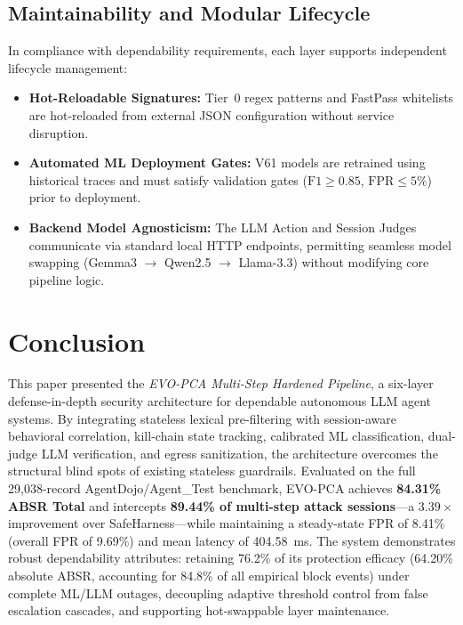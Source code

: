 \documentclass[conference]{IEEEtran}
\begin{document}
\subsection{Maintainability and Modular Lifecycle}
In compliance with dependability requirements, each layer supports independent lifecycle management:
\begin{itemize}[leftmargin=*]
    \item \textbf{Hot-Reloadable Signatures:} Tier~0 regex patterns and FastPass whitelists are hot-reloaded from external JSON configuration without service disruption.
    \item \textbf{Automated ML Deployment Gates:} V61 models are retrained using historical traces and must satisfy validation gates ($\text{F1} \geq 0.85$, $\text{FPR} \leq 5\%$) prior to deployment.
    \item \textbf{Backend Model Agnosticism:} The LLM Action and Session Judges communicate via standard local HTTP endpoints, permitting seamless model swapping (Gemma3 $\to$ Qwen2.5 $\to$ Llama-3.3) without modifying core pipeline logic.
\end{itemize}

\section{Conclusion}
This paper presented the \textit{EVO-PCA Multi-Step Hardened Pipeline}, a six-layer defense-in-depth security architecture for dependable autonomous LLM agent systems. By integrating stateless lexical pre-filtering with session-aware behavioral correlation, kill-chain state tracking, calibrated ML classification, dual-judge LLM verification, and egress sanitization, the architecture overcomes the structural blind spots of existing stateless guardrails. Evaluated on the full 29,038-record AgentDojo/Agent\_Test benchmark, EVO-PCA achieves \textbf{84.31\% ABSR Total} and intercepts \textbf{89.44\% of multi-step attack sessions}---a $3.39\times$ improvement over SafeHarness---while maintaining a steady-state FPR of 8.41\% (overall FPR of 9.69\%) and mean latency of 404.58~ms. The system demonstrates robust dependability attributes: retaining 76.2\% of its protection efficacy (64.20\% absolute ABSR, accounting for 84.8\% of all empirical block events) under complete ML/LLM outages, decoupling adaptive threshold control from false escalation cascades, and supporting hot-swappable layer maintenance.
\end{document}
